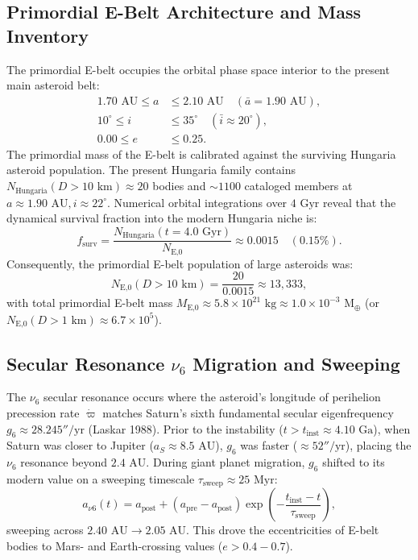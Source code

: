 \documentclass[11pt,a4paper]{article}
\begin{document}
\subsection{Primordial E-Belt Architecture and Mass Inventory}
The primordial E-belt occupies the orbital phase space interior to the present main asteroid belt:
\begin{align}
1.70\text{ AU} \le a &\le 2.10\text{ AU} \quad (\bar{a} = 1.90\text{ AU}), \\
10^\circ \le i &\le 35^\circ \quad (\bar{i} \approx 20^\circ), \\
0.00 \le e &\le 0.25.
\end{align}
The primordial mass of the E-belt is calibrated against the surviving Hungaria asteroid population. The present Hungaria family contains $N_{\text{Hungaria}}(D > 10\text{ km}) \approx 20$ bodies and $\sim 1100$ cataloged members at $a \approx 1.90\text{ AU}, i \approx 22^\circ$. Numerical orbital integrations over $4\text{ Gyr}$ reveal that the dynamical survival fraction into the modern Hungaria niche is:
\begin{equation}
f_{\text{surv}} = \frac{N_{\text{Hungaria}}(t = 4.0\text{ Gyr})}{N_{\text{E,0}}} \approx 0.0015 \quad (0.15\%).
\end{equation}
Consequently, the primordial E-belt population of large asteroids was:
\begin{equation}
N_{\text{E,0}}(D > 10\text{ km}) = \frac{20}{0.0015} \approx 13,333,
\end{equation}
with total primordial E-belt mass $M_{\text{E,0}} \approx 5.8 \times 10^{21}\text{ kg} \approx 1.0 \times 10^{-3}\text{ M}_\oplus$ (or $N_{\text{E,0}}(D > 1\text{ km}) \approx 6.7 \times 10^5$).

\subsection{Secular Resonance \texorpdfstring{$\nu_6$}{nu6} Migration and Sweeping}
The $\nu_6$ secular resonance occurs where the asteroid's longitude of perihelion precession rate $\dot{\varpi}$ matches Saturn's sixth fundamental secular eigenfrequency $g_6 \approx 28.245''/\text{yr}$ (Laskar 1988). Prior to the instability ($t > t_{\text{inst}} \approx 4.10\text{ Ga}$), when Saturn was closer to Jupiter ($a_S \approx 8.5\text{ AU}$), $g_6$ was faster ($\approx 52''/\text{yr}$), placing the $\nu_6$ resonance beyond $2.4\text{ AU}$. During giant planet migration, $g_6$ shifted to its modern value on a sweeping timescale $\tau_{\text{sweep}} \approx 25\text{ Myr}$:
\begin{equation}
a_{\nu 6}(t) = a_{\text{post}} + (a_{\text{pre}} - a_{\text{post}}) \exp\left(-\frac{t_{\text{inst}} - t}{\tau_{\text{sweep}}}\right),
\end{equation}
sweeping across $2.40\text{ AU} \to 2.05\text{ AU}$. This drove the eccentricities of E-belt bodies to Mars- and Earth-crossing values ($e > 0.4-0.7$).
\end{document}
